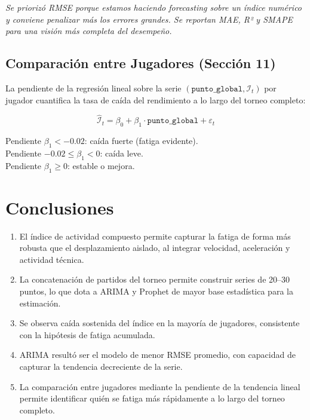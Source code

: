 \documentclass[10pt,twocolumn]{article}
\begin{document}
\noindent\small\textit{Se priorizó RMSE porque estamos haciendo forecasting
sobre un \'indice num\'erico y conviene penalizar m\'as los errores grandes.
Se reportan MAE, R² y SMAPE para una visi\'on m\'as completa del desempe\~no.}

\subsection{Comparación entre Jugadores (Sección 11)}

La pendiente de la regresi\'on lineal sobre la serie
$(\texttt{punto\_global}, \mathcal{I}_t)$ por jugador cuantifica la tasa de
ca\'ida del rendimiento a lo largo del torneo completo:

\begin{equation}
  \hat{\mathcal{I}}_t = \beta_0 + \beta_1 \cdot \texttt{punto\_global} + \varepsilon_t
\end{equation}

\noindent Pendiente $\beta_1 < -0.02$: ca\'ida fuerte (fatiga evidente).\\
Pendiente $-0.02 \leq \beta_1 < 0$: ca\'ida leve.\\
Pendiente $\beta_1 \geq 0$: estable o mejora.

\section{Conclusiones}

\begin{enumerate}[leftmargin=*, itemsep=2pt, topsep=2pt]
  \item El \'indice de actividad compuesto permite capturar la fatiga de forma
        m\'as robusta que el desplazamiento aislado, al integrar velocidad,
        aceleraci\'on y actividad t\'ecnica.
  \item La concatenaci\'on de partidos del torneo permite construir series de
        20--30 puntos, lo que dota a ARIMA y Prophet de mayor base estad\'istica
        para la estimaci\'on.
  \item Se observa ca\'ida sostenida del \'indice en la mayor\'ia de jugadores,
        consistente con la hip\'otesis de fatiga acumulada.
  \item ARIMA result\'o ser el modelo de menor RMSE promedio, con capacidad
        de capturar la tendencia decreciente de la serie.
  \item La comparaci\'on entre jugadores mediante la pendiente de la tendencia
        lineal permite identificar qui\'en se fatiga m\'as r\'apidamente a lo
        largo del torneo completo.
\end{enumerate}
\end{document}

